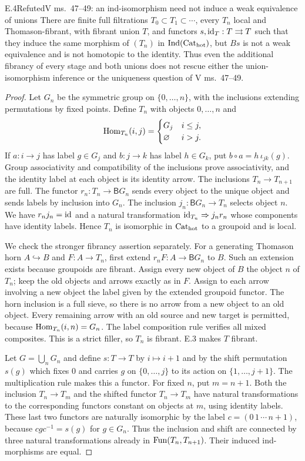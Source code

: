 \begin{claim}{E.4}{Refuted}{V ms.~47--49: an ind-isomorphism need not induce a weak equivalence of unions}
There are finite full filtrations $T_0\subset T_1\subset\cdots$, every $T_n$ local and Thomason-fibrant, with fibrant union $T$, and functors $s,\mathrm{id}_T:T\rightrightarrows T$ such that they induce the same morphism of $(T_n)$ in $\operatorname{Ind}({\mathrm{Cat}_{\mathrm{hot}}})$, but $Bs$ is not a weak equivalence and is not homotopic to the identity. Thus even the additional fibrancy of every stage and both unions does not rescue either the union-isomorphism inference or the uniqueness question of V ms.~47--49.
\end{claim}
\begin{proof}
Let $G_n$ be the symmetric group on $\{0,\ldots,n\}$, with the inclusions extending permutations by fixed points. Define $T_n$ with objects $0,\ldots,n$ and
\[
 \operatorname{Hom}_{T_n}(i,j)=\begin{cases}G_j&i\leq j,\\\varnothing&i>j.\end{cases}
\]
If $a:i\to j$ has label $g\in G_j$ and $b:j\to k$ has label $h\in G_k$, put $b\circ a=h\,\iota_{jk}(g)$. Group associativity and compatibility of the inclusions prove associativity, and the identity label at each object is its identity arrow. The inclusions $T_n\to T_{n+1}$ are full. The functor $r_n:T_n\to\mathsf BG_n$ sends every object to the unique object and sends labels by inclusion into $G_n$. The inclusion $j_n:\mathsf BG_n\to T_n$ selects object $n$. We have $r_nj_n=\mathrm{id}$ and a natural transformation $\mathrm{id}_{T_n}\Rightarrow j_nr_n$ whose components have identity labels. Hence $T_n$ is isomorphic in ${\mathrm{Cat}_{\mathrm{hot}}}$ to a groupoid and is local.

We check the stronger fibrancy assertion separately. For a generating Thomason horn $A\hookrightarrow B$ and $F:A\to T_n$, first extend $r_nF:A\to\mathsf BG_n$ to $B$. Such an extension exists because groupoids are fibrant. Assign every new object of $B$ the object $n$ of $T_n$; keep the old objects and arrows exactly as in $F$. Assign to each arrow involving a new object the label given by the extended groupoid functor. The horn inclusion is a full sieve, so there is no arrow from a new object to an old object. Every remaining arrow with an old source and new target is permitted, because $\operatorname{Hom}_{T_n}(i,n)=G_n$. The label composition rule verifies all mixed composites. This is a strict filler, so $T_n$ is fibrant. E.3 makes $T$ fibrant.

Let $G=\bigcup_nG_n$ and define $s:T\to T$ by $i\mapsto i+1$ and by the shift permutation $s(g)$ which fixes $0$ and carries $g$ on $\{0,\ldots,j\}$ to its action on $\{1,\ldots,j+1\}$. The multiplication rule makes this a functor. For fixed $n$, put $m=n+1$. Both the inclusion $T_n\to T_m$ and the shifted functor $T_n\to T_m$ have natural transformations to the corresponding functors constant on objects at $m$, using identity labels. These last two functors are naturally isomorphic by the label $c=(0\,1\,\cdots\,n+1)$, because
$cgc^{-1}=s(g)$ for $g\in G_n$. Thus the inclusion and shift are connected by three natural transformations already in $\operatorname{Fun}(T_n,T_{n+1})$. Their induced ind-morphisms are equal.


\end{proof}
